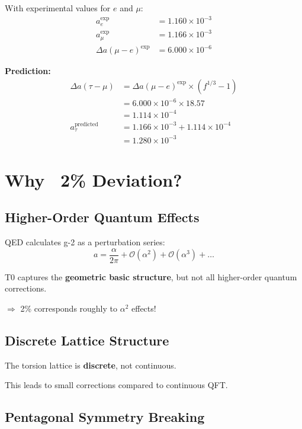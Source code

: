 	With experimental values for $e$ and $\mu$:
	\begin{align}
		a_e^{\text{exp}} &= 1.160 \times 10^{-3} \\
		a_\mu^{\text{exp}} &= 1.166 \times 10^{-3} \\
		\Delta a(\mu - e)^{\text{exp}} &= 6.000 \times 10^{-6}
	\end{align}
	
	\textbf{Prediction:}
	\begin{align}
		\Delta a(\tau - \mu) &= \Delta a(\mu - e)^{\text{exp}} \times (f^{1/3} - 1) \\
		&= 6.000 \times 10^{-6} \times 18.57 \\
		&= 1.114 \times 10^{-4} \\
		a_\tau^{\text{predicted}} &= 1.166 \times 10^{-3} + 1.114 \times 10^{-4} \\
		&= 1.280 \times 10^{-3}
	\end{align}
	
	\section{Why ~2\% Deviation?}
	
	\subsection{Higher-Order Quantum Effects}
	
	QED calculates g-2 as a perturbation series:
	\begin{equation}
		a = \frac{\alpha}{2\pi} + \mathcal{O}(\alpha^2) + \mathcal{O}(\alpha^3) + \ldots
	\end{equation}
	
	T0 captures the \textbf{geometric basic structure}, but not all higher-order quantum corrections.
	
	$\Rightarrow$ 2\% corresponds roughly to $\alpha^2$ effects!
	
	\subsection{Discrete Lattice Structure}
	
	The torsion lattice is \textbf{discrete}, not continuous.
	
	This leads to small corrections compared to continuous QFT.
	
	\subsection{Pentagonal Symmetry Breaking}
	
